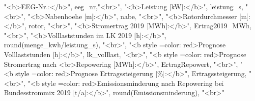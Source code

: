 \documentclass[
]{article}
\newenvironment{Shaded}{\begin{snugshade}}{\end{snugshade}}
\newcommand{\FunctionTok}[1]{\textcolor[rgb]{0.00,0.00,0.00}{#1}}
\newcommand{\NormalTok}[1]{#1}
\newcommand{\SpecialCharTok}[1]{\textcolor[rgb]{0.00,0.00,0.00}{#1}}
\newcommand{\StringTok}[1]{\textcolor[rgb]{0.31,0.60,0.02}{#1}}
\begin{document}
\begin{Shaded}
\begin{Highlighting}[]
                            \StringTok{"\textless{}b\textgreater{}EEG{-}Nr.:\textless{}/b\textgreater{}"}\NormalTok{, eeg\_nr,}\StringTok{"\textless{}br\textgreater{}"}\NormalTok{,}
                            \StringTok{"\textless{}b\textgreater{}Leistung [kW]:\textless{}/b\textgreater{}"}\NormalTok{, leistung\_s, }\StringTok{"\textless{}br\textgreater{}"}\NormalTok{,}
                            \StringTok{"\textless{}b\textgreater{}Nabenhoehe [m]:\textless{}/b\textgreater{}"}\NormalTok{, nabe, }\StringTok{"\textless{}br\textgreater{}"}\NormalTok{,}
                            \StringTok{"\textless{}b\textgreater{}Rotordurchmesser [m]:\textless{}/b\textgreater{}"}\NormalTok{, rotor, }\StringTok{"\textless{}br\textgreater{}"}\NormalTok{,}
                            \StringTok{"\textless{}b\textgreater{}Stromertrag 2019 [MWh]:\textless{}/b\textgreater{}"}\NormalTok{, Ertrag2019\_MWh, }\StringTok{"\textless{}br\textgreater{}"}\NormalTok{,}
                            \StringTok{"\textless{}b\textgreater{}Volllaststunden im LK 2019 [h]:\textless{}/b\textgreater{}"}\NormalTok{,  }
                            \FunctionTok{round}\NormalTok{(menge\_kwh}\SpecialCharTok{/}\NormalTok{leistung\_s), }\StringTok{"\textless{}br\textgreater{}"}\NormalTok{,}
                            \StringTok{"\textless{}b style =\textquotesingle{}color: red\textquotesingle{}\textgreater{}Prognose Volllaststunden [h]:\textless{}/b\textgreater{}"}\NormalTok{,}
\NormalTok{                            lk\_volllast, }\StringTok{"\textless{}br\textgreater{}"}\NormalTok{,}
                            \StringTok{"\textless{}b style =\textquotesingle{}color: red\textquotesingle{}\textgreater{}Prognose Stromertrag nach}
\StringTok{                            \textless{}br\textgreater{}Repowering [MWh]:\textless{}/b\textgreater{}"}\NormalTok{, ErtragRepowert, }\StringTok{"\textless{}br\textgreater{}"}\NormalTok{,}
                            \StringTok{"\textless{}b style =\textquotesingle{}color: red\textquotesingle{}\textgreater{}Prognose Ertragssteigerung}
\StringTok{                            [\%]:\textless{}/b\textgreater{}"}\NormalTok{, Ertragssteigerung, }\StringTok{"\textless{}br\textgreater{}"}\NormalTok{,}
                            \StringTok{"\textless{}b style =\textquotesingle{}color: red\textquotesingle{}\textgreater{}Emissionsminderung nach Repowering}
\StringTok{                            bei Bundesstrommix 2019 [t/a]:\textless{}/b\textgreater{}"}\NormalTok{,}
                            \FunctionTok{round}\NormalTok{(Emissionsminderung), }\StringTok{"\textless{}br\textgreater{}"}

\end{Highlighting}
\end{Shaded}
\end{document}
